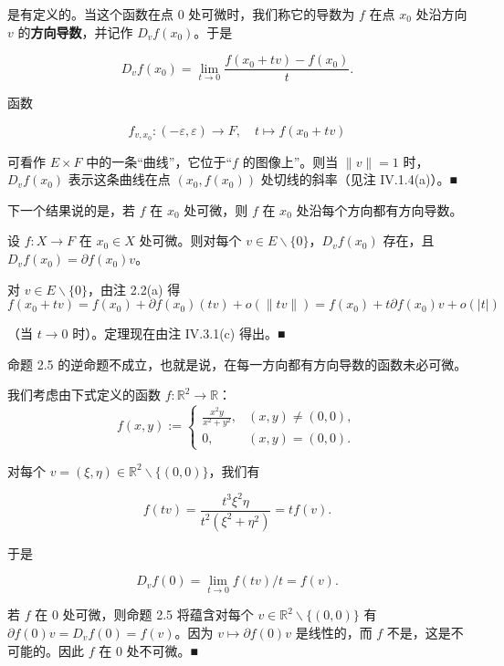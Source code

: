 是有定义的。当这个函数在点 $ 0 $ 处可微时，我们称它的导数为 $ f $ 在点 $ x_0 $ 处沿方向 $ v $ 的\textbf{方向导数}，并记作 $ D_v f(x_0) $。于是

\[
D_v f(x_0) = \lim_{t \to 0} \frac{f(x_0 + tv) - f(x_0)}{t} .
\]

\begin{remark}

函数

\[
f_{v,x_0} : (-\varepsilon, \varepsilon) \to F , \quad t \mapsto f(x_0 + tv)
\]

可看作 $ E \times F $ 中的一条“曲线”，它位于“$ f $ 的图像上”。则当 $ \|v\| = 1 $ 时，$ D_v f(x_0) $ 表示这条曲线在点 $ (x_0, f(x_0)) $ 处切线的斜率（见注 IV.1.4(a)）。\nobreak\hspace{0.35em}■


下一个结果说的是，若 $ f $ 在 $ x_0 $ 处可微，则 $ f $ 在 $ x_0 $ 处沿每个方向都有方向导数。

\end{remark}

\begin{proposition}

设 $ f : X \to F $ 在 $ x_0 \in X $ 处可微。则对每个 $ v \in E \backslash \{0\} $，$ D_v f(x_0) $ 存在，且 $ D_v f(x_0) = \partial f(x_0)v $。

\proofhead
对 $ v \in E \backslash \{0\} $，由注 2.2(a) 得
\[
f(x_0 + tv) = f(x_0) + \partial f(x_0)(tv) + o(\|tv\|) = f(x_0) + t \partial f(x_0)v + o(|t|)
\]

（当 $ t \to 0 $ 时）。定理现在由注 IV.3.1(c) 得出。\nobreak\hspace{0.35em}■

\end{proposition}

\begin{remark}

命题 2.5 的逆命题不成立，也就是说，在每一方向都有方向导数的函数未必可微。

\proofhead
我们考虑由下式定义的函数 $ f : \mathbb{R}^2 \to \mathbb{R} $：
\begin{equation*}
f(x,y) := \begin{cases} \frac{x^2 y}{x^2 + y^2} , & (x,y) \ne (0,0) , \\ 0 , & (x,y) = (0,0) . \end{cases}
\end{equation*}

对每个 $ v = (\xi, \eta) \in \mathbb{R}^2 \backslash \{(0,0)\} $，我们有

\[
f(tv) = \frac{t^3 \xi^2 \eta}{t^2(\xi^2 + \eta^2)} = t f(v) .
\]

于是

\[
D_v f(0) = \lim_{t \to 0} f(tv)/t = f(v) .
\]

若 $ f $ 在 $ 0 $ 处可微，则命题 2.5 将蕴含对每个 $ v \in \mathbb{R}^2 \backslash \{(0,0)\} $ 有 $ \partial f(0)v = D_v f(0) = f(v) $。因为 $ v \mapsto \partial f(0)v $ 是线性的，而 $ f $ 不是，这是不可能的。因此 $ f $ 在 $ 0 $ 处不可微。\nobreak\hspace{0.35em}■

\end{remark}

